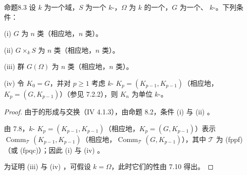 \begin{SGAresult}{命题}{8.3}
设 $k$ 为一个域，$S$ 为一个 $k$-，$\Omega$ 为 $k$ 的一个，$G$ 为一个、 $k$-。下列条件：

(i) $G$ 为 $n$ 类（相应地，$n$ 类）。

(ii) $G\times_k S$ 为 $n$ 类（相应地，$n$ 类）。

(iii) 群 $G(\Omega)$ 为 $n$ 类（相应地，$n$ 类）。

(iv) 令 $K_0=G$，并对 $p\geq1$ 考虑 $k$- $K_p=(K_{p-1},K_{p-1})$（相应地，$K_p=(G,K_{p-1})$）（参见 7.2.2），则 $K_n$ 为单位 $k$-。
\end{SGAresult}
\begin{proof}
由于的形成与交换（IV 4.1.3），由命题 8.2，条件 (i) 与 (ii) 。

由 7.8，$k$- $K_p=(K_{p-1},K_{p-1})$（相应地，$K_p=(G,K_{p-1})$）表示 $\operatorname{Comm}_{\mathscr T}(K_{p-1},K_{p-1})$（相应地，$\operatorname{Comm}_{\mathscr T}(G,K_{p-1})$），其中 $\mathscr T$ 为 (fppf)（或 (fpqc)）；因此 (i) 与 (iv) 。

为证明 (iii) 与 (iv) ，可假设 $k=\Omega$，此时它们的性由 7.10 得出。
\end{proof}

